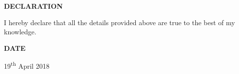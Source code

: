 \documentclass[a4paper]{article}
\begin{document}

	\begin{flushleft}
		\vspace{5mm}
		\large{\textbf{DECLARATION}} 
		\vspace{0.5mm}
		\noindent\hrulefill
		\vspace{0.5mm}
	\end{flushleft}
	I hereby declare that all the details provided above are true to the best of my knowledge.

	\begin{flushleft}
		\vspace{5mm}
		\large{\textbf{DATE}} 
		\vspace{0.5mm}
		\noindent\hrulefill
		\vspace{0.5mm}
	\end{flushleft}
	19\textsuperscript{th} April 2018
	
	
\end{document}

